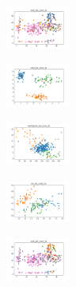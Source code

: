 \begin{figure}[H]
    \begin{subfigure}
        \centering
        \includegraphics[width=0.234\textwidth]{img/copkm/ecoli_set_const_10_277451237_clust.png}
    \end{subfigure}
    \hfill
    \begin{subfigure}
        \centering
        \includegraphics[width=0.234\textwidth]{img/copkm/rand_set_const_10_277451237_clust.png}
    \end{subfigure}
    \hfill
    \begin{subfigure}
        \centering
        \includegraphics[width=0.234\textwidth]{img/copkm/newthyroid_set_const_10_277451237_clust.png}
    \end{subfigure}
    \hfill
    \begin{subfigure}
        \centering
        \includegraphics[width=0.234\textwidth]{img/copkm/iris_set_const_10_49258669_clust.png}
    \end{subfigure}
    \hfill
    \begin{subfigure}
        \centering
        \includegraphics[width=0.234\textwidth]{img/copkm/ecoli_set_const_10_49258669_clust.png}
    \end{subfigure}
    \hfill
    \begin{subfigure}
        \centering

\end{subfigure}
\end{figure}
